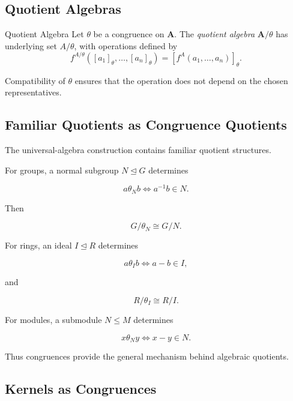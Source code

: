 \subsection{Quotient Algebras}
\label{subsec:quotient-algebras}

\begin{definitionbox}{Quotient Algebra}
Let \(\theta\) be a congruence on \(\mathbf A\). The \emph{quotient algebra}
\(\mathbf A/\theta\) has underlying set \(A/\theta\), with operations defined
by
\[ f^{A/\theta}([a_1]_\theta,\ldots,[a_n]_\theta)
=[f^A(a_1,\ldots,a_n)]_\theta. \]
\end{definitionbox}

Compatibility of \(\theta\) ensures that the operation does not depend on
the chosen representatives.

\subsection{Familiar Quotients as Congruence Quotients}
\label{subsec:familiar-congruence-quotients}

The universal-algebra construction contains familiar quotient structures.

For groups, a normal subgroup \(N\trianglelefteq G\) determines

\[ a\mathrel{\theta_N}b
\iff a^{-1}b\in N. \]

Then

\[ G/\theta_N\cong G/N. \]

For rings, an ideal \(I\trianglelefteq R\) determines

\[ a\mathrel{\theta_I}b
\iff a-b\in I, \]

and

\[ R/\theta_I\cong R/I. \]

For modules, a submodule \(N\leq M\) determines

\[ x\mathrel{\theta_N}y
\iff x-y\in N. \]

Thus congruences provide the general mechanism behind algebraic quotients.

\subsection{Kernels as Congruences}
\label{subsec:kernels-as-congruences}

